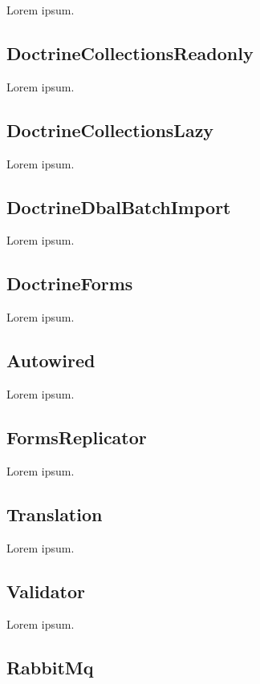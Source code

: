 Lorem ipsum.

\tocless\subsection{DoctrineCollectionsReadonly}

Lorem ipsum.

\tocless\subsection{DoctrineCollectionsLazy}

Lorem ipsum.

\tocless\subsection{DoctrineDbalBatchImport}

Lorem ipsum.

\tocless\subsection{DoctrineForms}

Lorem ipsum.

\tocless\subsection{Autowired}

Lorem ipsum.

\tocless\subsection{FormsReplicator}

Lorem ipsum.

\tocless\subsection{Translation}

Lorem ipsum.

\tocless\subsection{Validator}

Lorem ipsum.

\tocless\subsection{RabbitMq}

